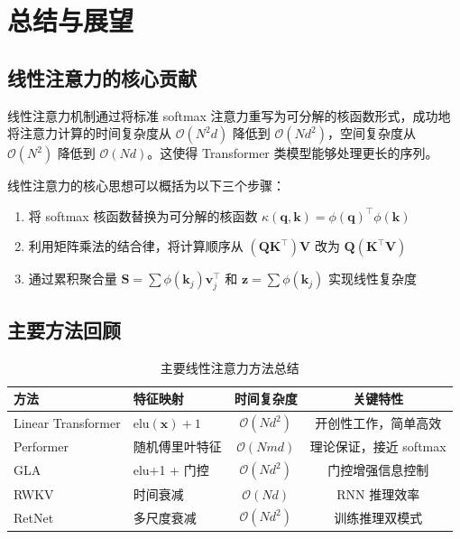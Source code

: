 \chapter{总结与展望}

\section{线性注意力的核心贡献}

线性注意力机制通过将标准 softmax 注意力重写为可分解的核函数形式，成功地将注意力计算的时间复杂度从 $\mathcal{O}(N^2 d)$ 降低到 $\mathcal{O}(Nd^2)$，空间复杂度从 $\mathcal{O}(N^2)$ 降低到 $\mathcal{O}(Nd)$。这使得 Transformer 类模型能够处理更长的序列。

线性注意力的核心思想可以概括为以下三个步骤：

\begin{enumerate}
    \item 将 softmax 核函数替换为可分解的核函数 $\kappa(\mathbf{q}, \mathbf{k}) = \phi(\mathbf{q})^\top \phi(\mathbf{k})$
    \item 利用矩阵乘法的结合律，将计算顺序从 $(\mathbf{Q}\mathbf{K}^\top)\mathbf{V}$ 改为 $\mathbf{Q}(\mathbf{K}^\top\mathbf{V})$
    \item 通过累积聚合量 $\mathbf{S} = \sum \phi(\mathbf{k}_j)\mathbf{v}_j^\top$ 和 $\mathbf{z} = \sum \phi(\mathbf{k}_j)$ 实现线性复杂度
\end{enumerate}

\section{主要方法回顾}

\begin{table}[H]
    \centering
    \begin{tabular}{l|l|c|c}
        \toprule
        方法 & 特征映射 & 时间复杂度 & 关键特性 \\
        \midrule
        Linear Transformer & $\text{elu}(\mathbf{x}) + 1$ & $\mathcal{O}(Nd^2)$ & 开创性工作，简单高效 \\
        Performer & 随机傅里叶特征 & $\mathcal{O}(Nmd)$ & 理论保证，接近 softmax \\
        GLA & elu+1 + 门控 & $\mathcal{O}(Nd^2)$ & 门控增强信息控制 \\
        RWKV & 时间衰减 & $\mathcal{O}(Nd)$ & RNN 推理效率 \\
        RetNet & 多尺度衰减 & $\mathcal{O}(Nd^2)$ & 训练推理双模式 \\
        \bottomrule
    \end{tabular}
    \caption{主要线性注意力方法总结}
\end{table}

